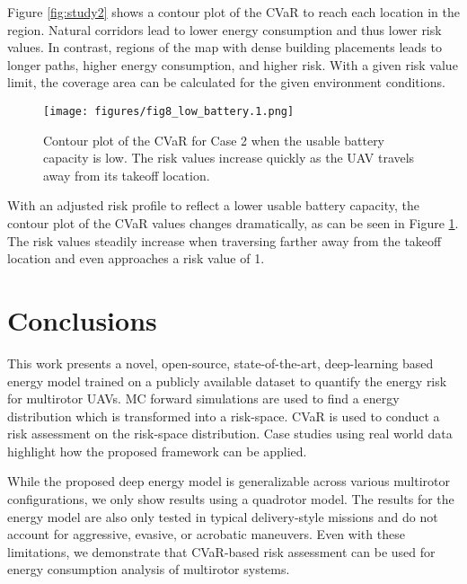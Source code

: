 \documentclass[letterpaper, 10 pt, conference]{ieeeconf}
\begin{document}
Figure \ref{fig:study2} shows a contour plot of the CVaR to reach each location in the region. Natural corridors lead to lower energy consumption and thus lower risk values. In contrast, regions of the map with dense building placements leads to longer paths, higher energy consumption, and higher risk.
With a given risk value limit, the coverage area can be calculated for the given environment conditions.
\begin{figure}
    \centering
      \texttt{[image: figures/fig8\_low\_battery.1.png]}
    \caption{Contour plot of the CVaR for Case 2 when the usable battery capacity is low. The risk values increase quickly as the UAV travels away from its takeoff location.}
    \label{fig:study2bat}
\end{figure}

With an adjusted risk profile to reflect a lower usable battery capacity, the contour plot of the CVaR values changes dramatically, as can be seen in Figure \ref{fig:study2bat}. The risk values steadily increase when traversing farther away from the takeoff location and even approaches a risk value of 1.




\section{Conclusions}
\label{sec:conclusion}
This work presents a novel, open-source, state-of-the-art, deep-learning based energy model trained on a publicly available dataset to quantify the energy risk for multirotor UAVs. MC forward simulations are used to find a energy distribution which is transformed into a risk-space. CVaR is used to conduct a risk assessment on the risk-space distribution. Case studies using real world data highlight how the proposed framework can be applied. 

While the proposed deep energy model is generalizable across various multirotor configurations, we only show results using a quadrotor model. The results for the energy model are also only tested in typical delivery-style missions and do not account for aggressive, evasive, or acrobatic maneuvers. Even with these limitations, we demonstrate that CVaR-based risk assessment can be used for energy consumption analysis of multirotor systems.    
\end{document}
